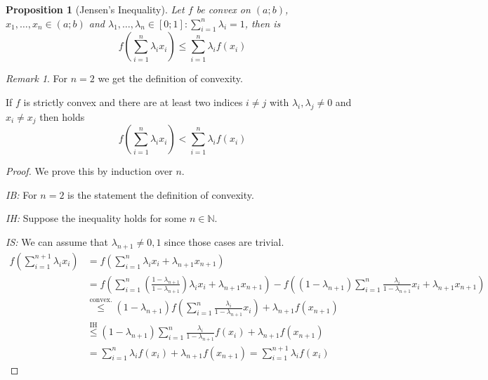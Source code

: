 \documentclass[english,titlepage]{uzhpub}
\theoremstyle{definition}
\theoremstyle{plain}
\newtheorem{proposition}[definition]{Proposition}
\theoremstyle{remark}
\newtheorem*{remark}{Remark}
\theoremstyle{example}
\begin{document}
   \begin{proposition}[Jensen's Inequality]\label{pro:jensen_ineq}
      Let \(f\) be convex on \((a; b)\), \(x_1, \ldots, x_n \in (a; b)\) and \(\lambda_1, \ldots, \lambda_n \in [0; 1]: \sum_{i = 1}^n \lambda_i = 1\), then is
      \[f\left(\sum_{i=1}^n \lambda_i x_i\right) \leq \sum_{i=1}^n \lambda_i f(x_i)\]
   \end{proposition}
   \begin{remark}
      For \(n = 2\) we get the definition of convexity.

      If \(f\) is strictly convex and there are at least two indices \(i \neq j\) with \(\lambda_i, \lambda_j \neq 0\) and \(x_i \neq x_j\) then holds
      \[f\left(\sum_{i=1}^n \lambda_i x_i\right) < \sum_{i = 1}^n \lambda_i f(x_i)\]
   \end{remark}
   \begin{proof}
      We prove this by induction over \(n\).

      \textit{IB:} For \(n = 2\) is the statement the definition of convexity.

      \textit{IH:} Suppose the inequality holds for some \(n \in \mathbb{N}\).

      \textit{IS:} We can assume that \(\lambda_{n+1} \neq 0, 1\) since those cases are trivial.
      \begin{equation*}
         \begin{split}
            f\left(\sum_{i=1}^{n+1} \lambda_i x_i\right) & = f\left(\sum_{i=1}^n \lambda_i x_i + \lambda_{n+1} x_{n+1}\right)\\
                                                         & = f\left(\sum_{i=1}^n\left(\frac{1- \lambda_{n+1}}{1 - \lambda_{n+1}}\right) \lambda_i x_i + \lambda_{n+1} x_{n+1}\right) - f\left((1 - \lambda_{n+1})\sum_{i=1}^n \frac{\lambda_i}{1-\lambda_{n+1}}x_i + \lambda_{n+1}x_{n+1}\right)\\
                                                         & \overset{\text{convex.}}{\leq} (1 - \lambda_{n+1}) f\left(\sum_{i=1}^n \frac{\lambda_i}{1 - \lambda_{n+1}} x_i\right) + \lambda_{n+1} f(x_{n+1})\\
                                                         & \overset{\text{IH}}{\leq} (1 - \lambda_{n+1}) \sum_{i=1}^n \frac{\lambda_i}{1 - \lambda_{n+1}} f(x_i) + \lambda_{n+1}f(x_{n+1})\\
                                                         & = \sum_{i=1}^n \lambda_i f(x_i) + \lambda_{n+1}f(x_{n+1}) = \sum_{i=1}^{n+1} \lambda_i f(x_i)
         \end{split}
      \end{equation*}
   \end{proof}
\end{document}
